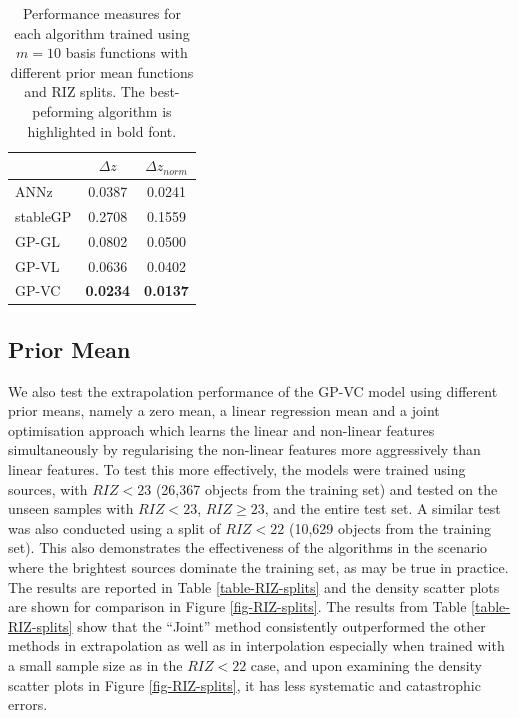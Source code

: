 \documentclass[useAMS,usenatbib,fleqn]{mn2e}
\begin{document}
 \begin{table}
\caption{Performance measures for each algorithm trained using $m=10$ basis functions with different prior mean functions and RIZ splits. The best-peforming algorithm is highlighted in bold font.}
\begin{center}
  \begin{tabular}{| l | c | c | }
     				&	$\Delta z$	&	$\Delta z_{norm}$	\\	\hline
	ANNz		&	0.0387			&	0.0241				\\
	stableGP		&	0.2708			&	0.1559				\\
	GP-GL		&	0.0802			&	0.0500				\\
	GP-VL		&	0.0636			&	0.0402				\\
	GP-VC		&	\textbf{0.0234}		&	\textbf{0.0137}			\\	\hline
  \end{tabular}
  \label{table-experiment-1}
\end{center}
\end{table}

\subsection{Prior Mean}

We also test the extrapolation performance of the GP-VC model using different prior means, namely a zero mean, a linear regression mean and a joint optimisation approach which learns the linear and non-linear features simultaneously by regularising the non-linear features more aggressively than linear features. To test this more effectively,  the models were trained using sources, with $RIZ<23$ (26,367 objects from the training set) and tested on the unseen samples with $RIZ<23$, $RIZ\ge23$, and the entire test set. A similar test was also conducted using a split of $RIZ<22$ (10,629 objects  from the training set). This also demonstrates the effectiveness of the algorithms in the scenario where the brightest sources dominate the training set, as may be true in practice. The results are reported in Table \ref{table-RIZ-splits} and the density scatter plots are shown for comparison in Figure \ref{fig-RIZ-splits}. The results from Table \ref{table-RIZ-splits} show that the ``Joint'' method consistently outperformed the other methods in extrapolation as well as in interpolation especially when trained with a small sample size as in the $RIZ<22$ case, and upon examining the density scatter plots in Figure \ref{fig-RIZ-splits}, it has less systematic and catastrophic errors.
\end{document}
